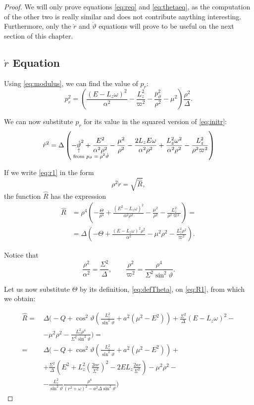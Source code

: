 \begin{proof}
	We will only prove equations \ref{eq:req} and \ref{eq:thetaeq}, as the computation of the other two is really similar and does not contribute anything interesting. Furthermore, only the $\dot{r}$ and $\dot{\vartheta}$ equations will prove to be useful on the next section of this chapter.
	
	\subsection*{$\dot{r}$ Equation}
	
	Using \autoref{eq:modulus}, we can find the value of $p_r$:
	\[
	p_r^2 = \left( \frac{(E - L_z\omega)^2}{\alpha^2} - \frac{L_z^2}{\varpi^2} - \frac{p_\vartheta^2}{\rho^2} - \mu^2 \right) \frac{\rho^2}{\Delta}.
	\]
	
	We can now substitute $p_r$ for its value in the squared version of \autoref{eq:initr}:
	\begin{equation}
	\label{eq:r1}
	\dot{r}^2 = \Delta \left( -\eqnote{\dot{\vartheta}}{from $p_\vartheta = \rho^2\dot{\vartheta}$}^2 + \frac{E^2}{\alpha^2\rho^2} - \frac{\mu^2}{\rho^2} - \frac{2L_zE\omega}{\alpha^2\rho^2} + \frac{L_z^2\omega^2}{\alpha^2\rho^2} - \frac{L_z^2}{\rho^2\varpi^2} \right)
	\end{equation}
	
	If we write \autoref{eq:r1} in the form
	\[
	\rho^2 \dot{r} = \sqrt{\widehat{R}},
	\]
	the function $\widehat{R}$ has the expression
	\begin{align}
	\nonumber
	\widehat{R} &= \rho^4 \left( -\frac{\Theta}{\rho^4} + \frac{(E^2 - L_z\omega)^2}{\alpha^2\rho^2} - \frac{\mu^2}{\rho^2} - \frac{L_z^2}{\rho^2\varpi^2} \right) = \\
	&= \Delta \left( -\Theta + \frac{(E-L_z\omega)^2\rho^2}{\alpha^2} - \mu^2\rho^2 - \frac{L_z^2 \rho^2}{\varpi^2} \right).
	\label{eq:R1}
	\end{align}
	
	Notice that
	\[
	\frac{\rho^2}{\alpha^2} = \frac{\Sigma^2}{\Delta}, \qquad \frac{\rho^2}{\varpi^2} = \frac{\rho^4}{\Sigma^2 \sin^2\vartheta}.
	\]
	
	Let us now substitute $\Theta$ by its definition, \autoref{eq:defTheta}, on \autoref{eq:R1}, from which we obtain:
	
	\begin{align}
	\widehat{R} =\,& \Delta \biggl( -Q + \cos^2\vartheta\left( \frac{L_z^2}{\sin^2\vartheta} + a^2 (\mu^2 - E^2) \right) + \frac{\Sigma^2}{\Delta}(E - L_z\omega)^2 - \nonumber \\
	&- \mu^2\rho^2 - \frac{L_z^2\rho^4}{\Sigma^2\sin^2\vartheta} \biggr) = \nonumber \\
	=\,& \Delta \biggl( -Q + \cos^2\vartheta\left( \frac{L_z^2}{\sin^2\vartheta} + a^2 (\mu^2 - E^2) \right) + \nonumber \\
	&+ \frac{\Sigma^2}{\Delta}\left( E^2 + L_z^2\left( \frac{2ar}{\Sigma^2} \right)^2 - 2EL_z\frac{2ar}{\Sigma^2} \right)  - \mu^2\rho^2 - \nonumber \\
	&- \frac{L_z^2}{\sin^2\vartheta}\frac{\rho^4}{(r^2 + \omega)^2 - a^2\Delta\sin^2\vartheta} \biggr)
	\end{align}
	

\end{proof}
